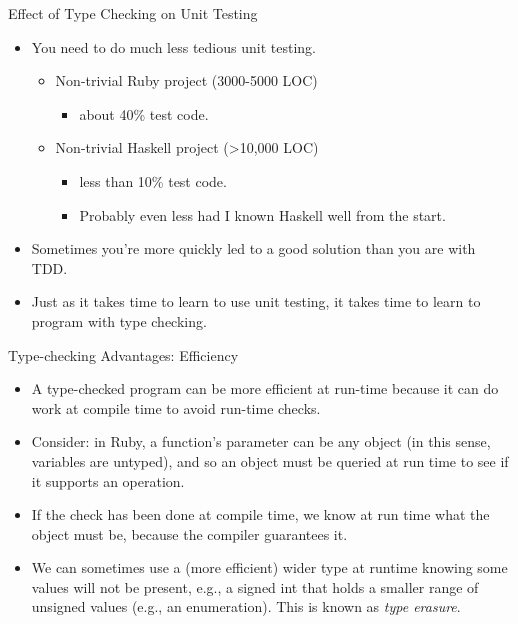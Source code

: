 \documentclass[xcolor=dvipsnames]{beamer}          %
\begin{document}
\begin{frame}[fragile]{Effect of Type Checking on Unit Testing}
\begin{itemize}
    \item You need to do much less tedious unit testing.
    \begin{itemize}
    \item Non-trivial Ruby project (3000-5000 LOC)
        \begin{itemize}
        \item about 40\% test code.
        \end{itemize}
    \item Non-trivial Haskell project (>10,000 LOC)
        \begin{itemize}
        \item less than 10\% test code.
        \item Probably even less had I known Haskell well from the start.
        \end{itemize}
    \end{itemize}
    \item Sometimes you're more quickly led to a good solution than you
        are with TDD.
    \item Just as it takes time to learn to use unit testing,
        it takes time to learn to program with type checking.
\end{itemize}
\end{frame}


\begin{frame}[fragile]{Type-checking Advantages: Efficiency}
\begin{itemize}
    \item A type-checked program can be more efficient at run-time
        because it can do work at compile time to avoid run-time checks.
    \item Consider: in Ruby, a function's parameter can be any object
        (in this sense, variables are untyped), and so an object must
        be queried at run time to see if it supports an operation.
    \item If the check has been done at compile time, we know at run
        time what the object must be, because the compiler guarantees
        it.
    \item We can sometimes use a (more efficient) wider type at runtime
        knowing some values will not be present, e.g., a signed int that
        holds a smaller range of unsigned values (e.g., an enumeration).
        This is known as \emph{type erasure}.
\end{itemize}
\end{frame}
\end{document}
